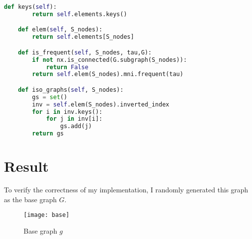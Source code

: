 \documentclass[a4paper, 12pt]{report}
\begin{document}
\begin{lstlisting}[language=python, frame=single]
    def keys(self):
        return self.elements.keys()

    def elem(self, S_nodes):
        return self.elements[S_nodes]

    def is_frequent(self, S_nodes, tau,G):
        if not nx.is_connected(G.subgraph(S_nodes)):
            return False
        return self.elem(S_nodes).mni.frequent(tau)

    def iso_graphs(self, S_nodes):
        gs = set()
        inv = self.elem(S_nodes).inverted_index
        for i in inv.keys():
            for j in inv[i]:
                gs.add(j)
        return gs
\end{lstlisting}

\chapter{Result}
To verify the correctness of my implementation, I randomly generated this graph as the base graph $G$.
\begin{figure}[H]
\centering
\texttt{[image: base]}
\caption{Base graph $g$}
\end{figure}
\end{document}

